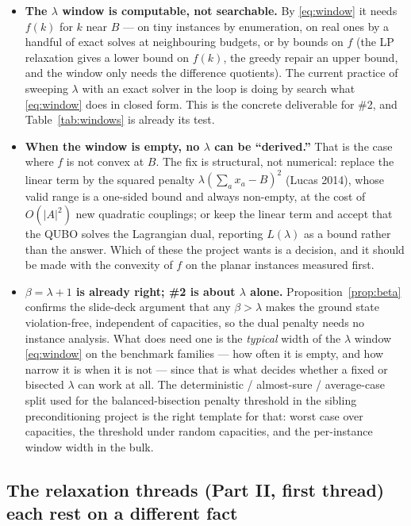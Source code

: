 \documentclass[11pt]{article}
\begin{document}
\begin{itemize}[leftmargin=1.5em]
\item \textbf{The $\lambda$ window is computable, not searchable.} By \eqref{eq:window} it needs $f(k)$ for $k$ near $B$ --- on tiny instances by enumeration, on real ones by a handful of exact solves at neighbouring budgets, or by bounds on $f$ (the LP relaxation gives a lower bound on $f(k)$, the greedy repair an upper bound, and the window only needs the difference quotients). The current practice of sweeping $\lambda$ with an exact solver in the loop is doing by search what \eqref{eq:window} does in closed form. This is the concrete deliverable for \#2, and Table~\ref{tab:windows} is already its test.
\item \textbf{When the window is empty, no $\lambda$ can be ``derived.''} That is the case where $f$ is not convex at $B$. The fix is structural, not numerical: replace the linear term by the squared penalty $\lambda(\sum_a x_a - B)^2$ (Lucas 2014), whose valid range is a one-sided bound and always non-empty, at the cost of $O(|A|^2)$ new quadratic couplings; or keep the linear term and accept that the QUBO solves the Lagrangian dual, reporting $L(\lambda)$ as a bound rather than the answer. Which of these the project wants is a decision, and it should be made with the convexity of $f$ on the planar instances measured first.
\item \textbf{$\beta = \lambda + 1$ is already right; \#2 is about $\lambda$ alone.} Proposition~\ref{prop:beta} confirms the slide-deck argument that any $\beta > \lambda$ makes the ground state violation-free, independent of capacities, so the dual penalty needs no instance analysis. What does need one is the \emph{typical} width of the $\lambda$ window \eqref{eq:window} on the benchmark families --- how often it is empty, and how narrow it is when it is not --- since that is what decides whether a fixed or bisected $\lambda$ can work at all. The deterministic / almost-sure / average-case split used for the balanced-bisection penalty threshold in the sibling preconditioning project is the right template for that: worst case over capacities, the threshold under random capacities, and the per-instance window width in the bulk.
\end{itemize}

\subsection*{The relaxation threads (Part II, first thread) each rest on a different fact}
\end{document}
